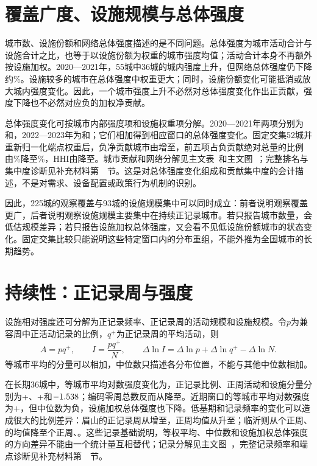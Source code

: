 \section*{覆盖广度、设施规模与总体强度}
城市数、设施份额和网络总体强度描述的是不同问题。总体强度为城市活动合计与设施合计之比，也等于以设施份额为权重的城市强度均值；活动合计本身不再额外按设施加权。2020—2021年，55城中36城的城内强度上升，但网络总体强度仍下降约\MiddleIDecline\%。设施较多的城市在总体强度中权重更大；同时，设施份额变化可能抵消或放大城内强度变化。因此，一个城市强度上升不必然对总体强度变化作出正贡献，强度下降也不必然对应负的加权净贡献。

总体强度变化可按城市内部强度项和设施权重项分解。2020—2021年两项分别为\MiddleWithin{}和\MiddleComposition{}，2022—2023年为\RecentWithin{}和\RecentComposition{}；它们相加得到相应窗口的总体强度变化。固定交集52城并重新归一化端点权重后，负净贡献城市由\CommonEarlyNegativeN{}增至\CommonRecentNegativeN{}，前五项占负贡献绝对总量的比例由\CommonEarlyTopFive\%降至\CommonRecentTopFive\%，HHI由\CommonEarlyHHI{}降至\CommonRecentHHI{}。城市贡献和网络分解见主文表~和主文图~；完整排名与集中度诊断见补充材料第~~节。这是对总体强度变化组成和贡献集中度的会计描述，不是对需求、设备配置或政策行为机制的识别。

因此，225城的观察覆盖与93城的设施规模集中可以同时成立：前者说明观察覆盖更广，后者说明观察设施规模主要集中在持续正记录城市。若只报告城市数量，会低估规模差异；若只报告设施加权总体强度，又会看不见低设施份额城市的状态变化。固定交集比较只能说明这些特定窗口内的分布重组，不能外推为全国城市的长期趋势。

\section*{持续性：正记录周与强度}
设施相对强度还可分解为正记录频率、正记录周的活动规模和设施规模。令$p$为兼容周中正活动记录的比例，$q^{+}$为正记录周的平均活动，则
\[
A=pq^{+},\qquad I=\frac{pq^{+}}{N},\qquad
\Delta\ln I=\Delta\ln p+\Delta\ln q^{+}-\Delta\ln N.
\]
等城市平均的分量可以相加，中位数只描述各分布位置，不能与其他中位数相加。

在长期36城中，等城市平均对数强度变化为\LongMeanI{}，正记录比例、正周活动和设施分量分别为+\LongMeanP{}、+\LongMeanQ{}和$-1.538{}$；编码零周总数反而从\LongZeroStart{}降至\LongZeroEnd{}。近期窗口的等城市平均对数强度为+\RecentMeanI{}，但中位数为负，设施加权总体强度也下降。低基期和记录频率的变化可以造成很大的比例差异：眉山的正记录周从\MeishanPosStart{}增至\MeishanPosEnd{}，正周均值从\MeishanQStart{}升至\MeishanQEnd{}；临沂则从\LinyiPosStart{}个正周、\LinyiQStart{}的均值降至\LinyiPosEnd{}个正周、\LinyiQEnd{}。这些记录基础说明，等权平均、中位数和设施加权总体强度的方向差异不能由一个统计量互相替代；记录分解见主文图~，完整记录频率和端点诊断见补充材料第~~节。

